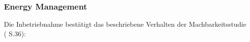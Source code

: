 %
%
%
%
%
%
%
%
% 
%


\subsubsection{Energy Management}
Die Inbetriebnahme bestätigt das beschriebene Verhalten der Machbarkeitsstudie (\cite{PA_bicycle} S.36):

